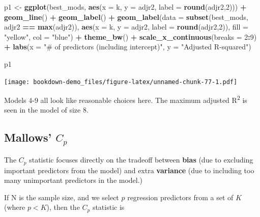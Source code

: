 \documentclass[]{book}
\newenvironment{Shaded}{\begin{snugshade}}{\end{snugshade}}
\newcommand{\KeywordTok}[1]{\textcolor[rgb]{0.13,0.29,0.53}{\textbf{#1}}}
\newcommand{\DataTypeTok}[1]{\textcolor[rgb]{0.13,0.29,0.53}{#1}}
\newcommand{\DecValTok}[1]{\textcolor[rgb]{0.00,0.00,0.81}{#1}}
\newcommand{\StringTok}[1]{\textcolor[rgb]{0.31,0.60,0.02}{#1}}
\newcommand{\OperatorTok}[1]{\textcolor[rgb]{0.81,0.36,0.00}{\textbf{#1}}}
\newcommand{\NormalTok}[1]{#1}
\theoremstyle{definition}
\theoremstyle{definition}
\theoremstyle{definition}
\theoremstyle{remark}
\begin{document}
\begin{Shaded}
\begin{Highlighting}[]
\NormalTok{p1 <-}\StringTok{ }\KeywordTok{ggplot}\NormalTok{(best_mods, }\KeywordTok{aes}\NormalTok{(}\DataTypeTok{x =}\NormalTok{ k, }\DataTypeTok{y =}\NormalTok{ adjr2,}
                            \DataTypeTok{label =} \KeywordTok{round}\NormalTok{(adjr2,}\DecValTok{2}\NormalTok{))) }\OperatorTok{+}
\StringTok{    }\KeywordTok{geom_line}\NormalTok{() }\OperatorTok{+}
\StringTok{    }\KeywordTok{geom_label}\NormalTok{() }\OperatorTok{+}
\StringTok{    }\KeywordTok{geom_label}\NormalTok{(}\DataTypeTok{data =} \KeywordTok{subset}\NormalTok{(best_mods,}
\NormalTok{                             adjr2 }\OperatorTok{==}\StringTok{ }\KeywordTok{max}\NormalTok{(adjr2)),}
               \KeywordTok{aes}\NormalTok{(}\DataTypeTok{x =}\NormalTok{ k, }\DataTypeTok{y =}\NormalTok{ adjr2, }\DataTypeTok{label =} \KeywordTok{round}\NormalTok{(adjr2,}\DecValTok{2}\NormalTok{)),}
               \DataTypeTok{fill =} \StringTok{"yellow"}\NormalTok{, }\DataTypeTok{col =} \StringTok{"blue"}\NormalTok{) }\OperatorTok{+}
\StringTok{    }\KeywordTok{theme_bw}\NormalTok{() }\OperatorTok{+}
\StringTok{    }\KeywordTok{scale_x_continuous}\NormalTok{(}\DataTypeTok{breaks =} \DecValTok{2}\OperatorTok{:}\DecValTok{9}\NormalTok{) }\OperatorTok{+}
\StringTok{    }\KeywordTok{labs}\NormalTok{(}\DataTypeTok{x =} \StringTok{"# of predictors (including intercept)"}\NormalTok{,}
         \DataTypeTok{y =} \StringTok{"Adjusted R-squared"}\NormalTok{)}

\NormalTok{p1}
\end{Highlighting}
\end{Shaded}

\texttt{[image: bookdown-demo\_files/figure-latex/unnamed-chunk-77-1.pdf]}

Models 4-9 all look like reasonable choices here. The maximum adjusted
R\textsuperscript{2} is seen in the model of size 8.

\subsection{\texorpdfstring{Mallows'
\(C_p\)}{Mallows' C\_p}}\label{mallows-c_p}

The \(C_p\) statistic focuses directly on the tradeoff between
\textbf{bias} (due to excluding important predictors from the model) and
extra \textbf{variance} (due to including too many unimportant
predictors in the model.)

If N is the sample size, and we select \(p\) regression predictors from
a set of \(K\) (where \(p < K\)), then the \(C_p\) statistic is
\end{document}
